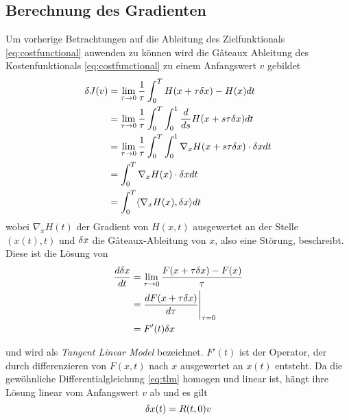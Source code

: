 \subsection{Berechnung des Gradienten}
Um vorherige Betrachtungen auf die Ableitung des Zielfunktionals \eqref{eq:costfunctional} anwenden zu können wird die Gâteaux Ableitung des Kostenfunktionals \eqref{eq:costfunctional} zu einem Anfangswert $v$ gebildet
\begin{equation}
\label{eq:gatcost}
\begin{aligned}
 \delta J(v)  &= \lim_{\tau\to 0} \frac{1}{\tau}\int_0^T H(x+\tau\delta x)-H(x) dt\\
	    &= \lim_{\tau\to 0} \frac{1}{\tau}\int_0^T \int_0^1 \frac{d}{ds}H(x+s\tau\delta x) dt\\
	    &= \lim_{\tau\to 0} \frac{1}{\tau}\int_0^T \int_0^1 \nabla_x H(x+s\tau\delta x)\cdot \delta x dt\\
	    &= \int_0^T \nabla_x H(x)\cdot \delta x dt\\
	    &= \int_0^T \langle \nabla_x H(x), \delta x \rangle dt\\  
\end{aligned}
\end{equation}
wobei $\nabla_x H(t)$ der Gradient von $H(x,t)$ ausgewertet an der Stelle $(x(t),t)$ und $\delta x$ die Gâteaux-Ableitung von $x$, also eine Störung, beschreibt. Diese ist die Lösung von
\begin{equation}
\label{eq:tlm}
\begin{aligned}
  \frac{d \delta x}{dt} &= \lim_{\tau\to 0}\frac{F(x+\tau \delta x)-F(x)}{\tau}\\
			 &= \frac{d F(x+\tau\delta x)}{d\tau} \Bigg\rvert_{\tau=0}\\
			 &= F'(t)\delta x
\end{aligned} 
\end{equation}

und wird als \textit{Tangent Linear Model} bezeichnet. $F'(t)$ ist der Operator, der durch differenzieren von $F(x,t)$ nach $x$ ausgewertet an $x(t)$ entsteht. Da die gewöhnliche Differentialgleichung \eqref{eq:tlm} homogen und linear ist, hängt ihre Lösung linear vom Anfangswert $v$ ab und es gilt
\begin{equation}
\label{eq:resolvent}
 \delta x(t) = R(t,0)v
\end{equation}

